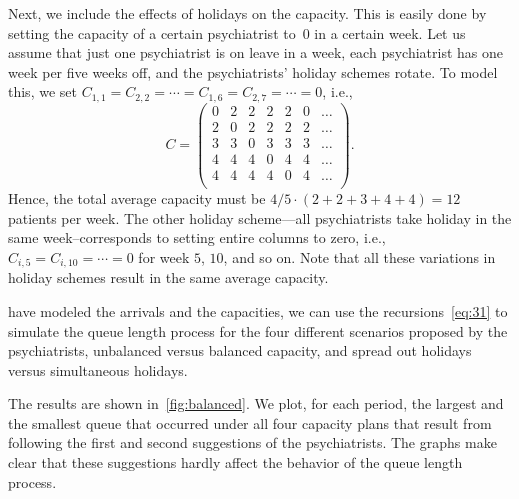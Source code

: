 Next, we include the effects of holidays on the capacity. This is
easily done by setting the capacity of a certain psychiatrist to~$0$ in
a certain week. Let us assume that just one psychiatrist is on leave in
a week, each psychiatrist has one week per five weeks off, and the
psychiatrists' holiday schemes rotate. To model this, we set
$C_{1,1}=C_{2,2}=\cdots=C_{1,6}=C_{2,7} =\cdots = 0$, i.e.,
\begin{equation*}
C =
 \begin{pmatrix}
 0 & 2 & 2 & 2 & 2 & 0 & \ldots \\
 2 & 0 & 2 & 2 & 2 & 2 & \ldots\\
 3 & 3 & 0 & 3 & 3 & 3 & \ldots\\
 4 & 4 & 4 & 0 & 4 & 4 & \ldots\\
 4 & 4 & 4 & 4 & 0 & 4 & \ldots\\
 \end{pmatrix}.
\end{equation*}
Hence, the total average capacity must be $4/5 \cdot (2+2+3+4+4) = 12$
patients per week. The other holiday scheme---all psychiatrists take
holiday in the same week--corresponds to setting entire columns to
zero, i.e., $C_{i,5}=C_{i,10}=\cdots=0$ for week $5$, $10$, and so
on. Note that all these variations in holiday schemes result in the
same average capacity.

 have modeled the arrivals and the capacities, we can use the recursions~\cref{eq:31} to simulate the queue length process for the four different scenarios proposed by the psychiatrists, unbalanced versus balanced capacity, and spread out holidays versus simultaneous holidays.

The results are shown in~\cref{fig:balanced}.
We plot, for each period, the largest and the smallest queue that occurred under all four capacity plans that result from following the first and second suggestions of the psychiatrists.
The graphs make clear that these suggestions hardly affect the behavior of the queue length process.




